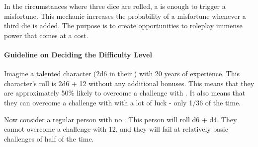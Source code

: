 \documentclass{LegrandOrangeTufteBook}
\begin{document}
In the circumstances where three dice are rolled,
a  is enough to trigger a misfortune.
This mechanic increases the probability of a misfortune
whenever a third die is added. The purpose is to create
opportunities to roleplay immense power that comes at a
cost.\\

\paragraph*{Guideline on Deciding the Difficulty Level}

Imagine a talented character (2d6 in their ) with 20 years of experience.
This character's roll is 2d6 + 12 without any additional bonuses.
This means that they are approximately 50\% likely to overcome a challenge with .
It also means that they can overcome a challenge with  with a lot of luck - only 1/36 of the time.\\

\marginpar{
	\footnotesize
	
}

Now consider a regular person with no . This person will roll d6 + d4.
They cannot overcome a challenge with 12,
and they will fail at relatively basic challenges of  half of the time.\\
\end{document}
